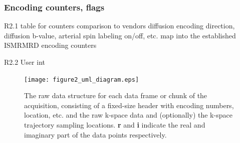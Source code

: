 \documentclass[12pt, draft]{article}
\newcommand{\madded}[2][None]{\added[remark=#1]{#2}}
\begin{document}
\subsubsection*{Encoding counters, flags}
R2.1 table for counters comparison to vendors
     diffusion encoding direction, diffusion b-value, arterial spin labeling on/off, etc. map into the established ISMRMRD encoding counters
     \madded[]{Fig.~\ref{fig:cstruct}}

R2.2 User int


\begin{figure}
\begin{center}
\texttt{[image: figure2\_uml\_diagram.eps]}
\caption{The raw data structure for each data frame or chunk of the acquisition, consisting of a fixed-size header with encoding numbers, location, etc. and the raw k-space data and (optionally) the k-space trajectory sampling locations. \textbf{r} and \textbf{i} indicate the real and imaginary part of the data points respectively.}
\label{fig:cstruct}
\end{center}
\end{figure}
\end{document}
